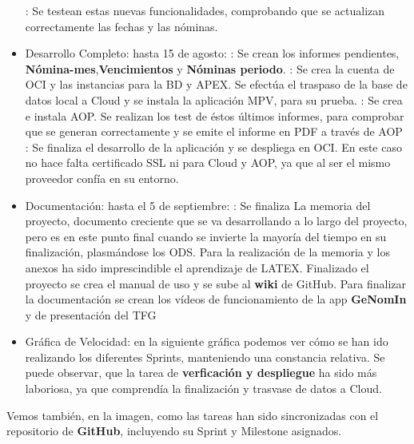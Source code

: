 \begin{itemize}
	: Se testean estas nuevas funcionalidades, comprobando que se actualizan correctamente las fechas y las nóminas.
	\item{Desarrollo Completo: hasta 15 de agosto}:
	: Se crean los informes pendientes, \textbf{Nómina-mes},\textbf{Vencimientos} y \textbf{Nóminas periodo}.
	: Se crea la cuenta de \acrshort{OCI} y las instancias para la BD y \acrshort{APEX}. Se efectúa el traspaso de la base de datos local a Cloud y se instala la aplicación MPV, para su prueba.
	: Se crea e instala \acrfull{AOP}. Se realizan los test de éstos últimos informes, para comprobar que se generan correctamente y se emite el informe en PDF a través de \acrshort{AOP}
	: Se finaliza el desarrollo de la aplicación y se despliega en \acrshort{OCI}. En este caso no hace falta certificado \acrshort{SSL} ni para Cloud y \acrshort{AOP}, ya que al ser el mismo proveedor confía en su entorno.
	\item{Documentación: hasta el 5 de septiembre}: 
	: Se finaliza La memoria del proyecto, documento creciente que se va desarrollando a lo largo del proyecto, pero es en este punto final cuando se invierte la mayoría del tiempo en su finalización, plasmándose los \acrfull{ODS}. Para la realización de la memoria y los anexos ha sido imprescindible el aprendizaje de \gls{LATEX}. Finalizado el proyecto se crea el manual de uso y se sube al \textbf{wiki} de GitHub.
	Para finalizar la documentación se crean los vídeos de funcionamiento de la app \textbf{GeNomIn} y de presentación del \acrshort{TFG}
	
	\item{Gráfica de Velocidad}: en la siguiente gráfica podemos ver cómo se han ido realizando los diferentes \gls{Sprint}s, manteniendo una constancia relativa. Se puede observar, que la tarea de \textbf{verficación y despliegue} ha sido más laboriosa, ya que comprendía la finalización y trasvase de datos a Cloud.
\end{itemize}

Vemos también, en la imagen, como las tareas han sido sincronizadas con el repositorio de \textbf{GitHub}, incluyendo su \gls{Sprint} y \gls{Milestone} asignados.

